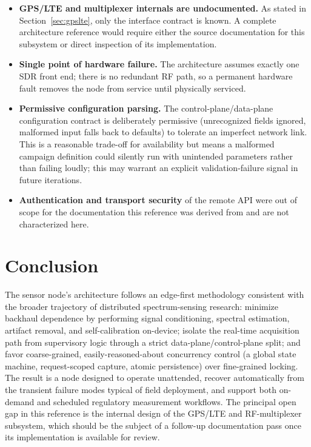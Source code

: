 \documentclass[11pt,a4paper]{article}
\begin{document}
\begin{itemize}[leftmargin=1.4em]
    \item \textbf{GPS/LTE and multiplexer internals are undocumented.} As stated in
    Section~\ref{sec:gpslte}, only the interface contract is known. A complete architecture
    reference would require either the source documentation for this subsystem or direct
    inspection of its implementation.
    \item \textbf{Single point of hardware failure.} The architecture assumes exactly one
    SDR front end; there is no redundant RF path, so a permanent hardware fault removes the
    node from service until physically serviced.
    \item \textbf{Permissive configuration parsing.} The control-plane/data-plane
    configuration contract is deliberately permissive (unrecognized fields ignored,
    malformed input falls back to defaults) to tolerate an imperfect network link. This is
    a reasonable trade-off for availability but means a malformed campaign definition could
    silently run with unintended parameters rather than failing loudly; this may warrant an
    explicit validation-failure signal in future iterations.
    \item \textbf{Authentication and transport security} of the remote API were out of scope
    for the documentation this reference was derived from and are not characterized here.
\end{itemize}

\section{Conclusion}

The sensor node's architecture follows an edge-first methodology consistent with the broader
trajectory of distributed spectrum-sensing research: minimize backhaul dependence by
performing signal conditioning, spectral estimation, artifact removal, and self-calibration
on-device; isolate the real-time acquisition path from supervisory logic through a strict
data-plane/control-plane split; and favor coarse-grained, easily-reasoned-about concurrency
control (a global state machine, request-scoped capture, atomic persistence) over fine-grained
locking. The result is a node designed to operate unattended, recover automatically from the
transient failure modes typical of field deployment, and support both on-demand and scheduled
regulatory measurement workflows. The principal open gap in this reference is the internal
design of the GPS/LTE and RF-multiplexer subsystem, which should be the subject of a follow-up
documentation pass once its implementation is available for review.
\end{document}
